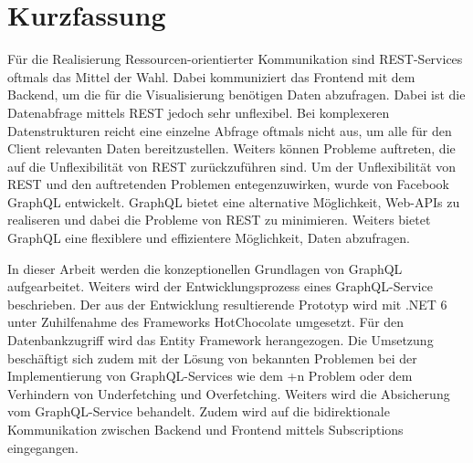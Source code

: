 \chapter{Kurzfassung}
\label{ch:kurzfassung}

Für die Realisierung Ressourcen-orientierter Kommunikation sind REST-Services oftmals das Mittel der Wahl.
Dabei kommuniziert das Frontend mit dem Backend, um die für die Visualisierung benötigen Daten abzufragen.
Dabei ist die Datenabfrage mittels REST jedoch sehr unflexibel.
Bei komplexeren Datenstrukturen reicht eine einzelne Abfrage oftmals nicht aus, um alle für den Client relevanten Daten bereitzustellen.
Weiters können Probleme auftreten, die auf die Unflexibilität von REST zurückzuführen sind.
Um der Unflexibilität von REST und den auftretenden Problemen entegenzuwirken, wurde von Facebook GraphQL entwickelt.
GraphQL bietet eine alternative Möglichkeit, Web-APIs zu realiseren und dabei die Probleme von REST zu minimieren.
Weiters bietet GraphQL eine flexiblere und effizientere Möglichkeit, Daten abzufragen.
\newline

In dieser Arbeit werden die konzeptionellen Grundlagen von GraphQL aufgearbeitet.
Weiters wird der Entwicklungsprozess eines GraphQL-Service beschrieben.
Der aus der Entwicklung resultierende Prototyp wird mit .NET 6 unter Zuhilfenahme des Frameworks HotChocolate umgesetzt.
Für den Datenbankzugriff wird das Entity Framework herangezogen.
Die Umsetzung beschäftigt sich zudem mit der Lösung von bekannten Problemen bei der Implementierung von GraphQL-Services wie dem +n Problem\grqq{} oder dem Verhindern von Underfetching und Overfetching.
Weiters wird die Absicherung vom GraphQL-Service behandelt.
Zudem wird auf die bidirektionale Kommunikation zwischen Backend und Frontend mittels Subscriptions eingegangen.
